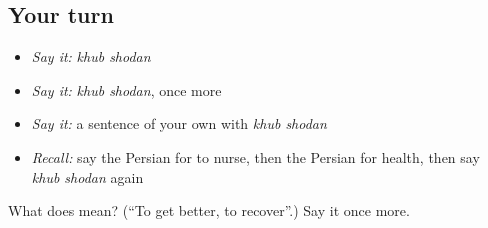 \subsection*{Your turn}
\begin{itemize}
\raggedright
  \item \emph{Say it:} \emph{khub shodan}
  \item \emph{Say it:} \emph{khub shodan}, once more
  \item \emph{Say it:} a sentence of your own with \emph{khub shodan}
  \item \emph{Recall:} say the Persian for to nurse, then the Persian for health, then say \emph{khub shodan} again
\end{itemize}

\begin{tcolorbox}[breakable,colback=teal!4,colframe=teal!35!black,title={Before you move on}]
What does   mean? (\textquotedblleft{}To get better, to recover\textquotedblright{}.) Say it once more.
\end{tcolorbox}
